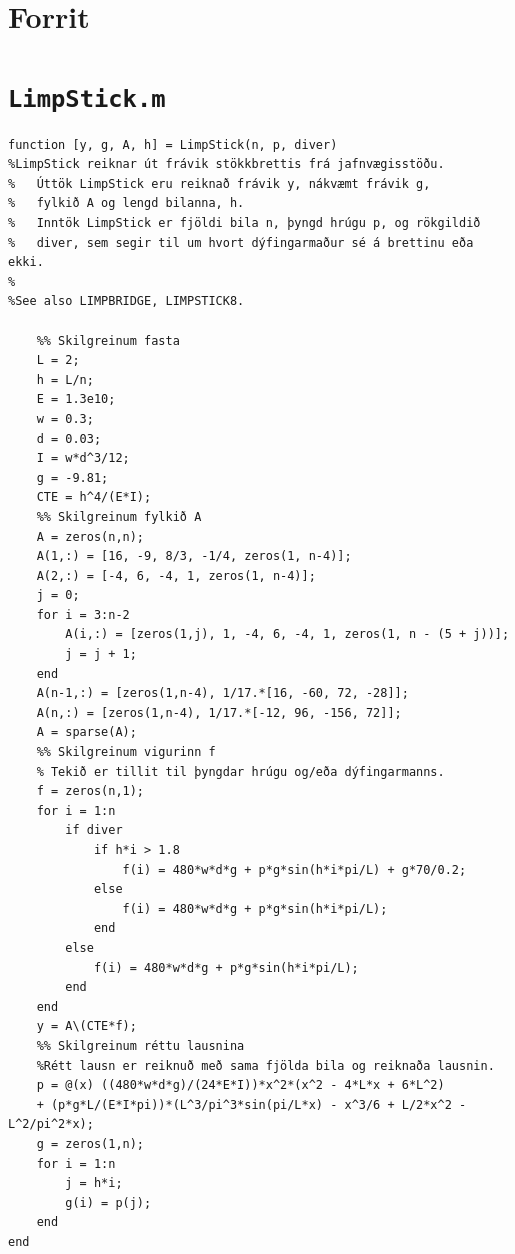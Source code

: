 \documentclass[11pt]{article}
\begin{document}
{\newpage
\section*{Forrit}


\section*{\texttt{LimpStick.m}}
\begin{verbatim}
function [y, g, A, h] = LimpStick(n, p, diver)
%LimpStick reiknar út frávik stökkbrettis frá jafnvægisstöðu.
%   Úttök LimpStick eru reiknað frávik y, nákvæmt frávik g, 
%   fylkið A og lengd bilanna, h.
%   Inntök LimpStick er fjöldi bila n, þyngd hrúgu p, og rökgildið
%   diver, sem segir til um hvort dýfingarmaður sé á brettinu eða ekki.
%
%See also LIMPBRIDGE, LIMPSTICK8.
    
    %% Skilgreinum fasta
    L = 2;
    h = L/n;
    E = 1.3e10;
    w = 0.3;
    d = 0.03;
    I = w*d^3/12;
    g = -9.81;
    CTE = h^4/(E*I);
    %% Skilgreinum fylkið A
    A = zeros(n,n);
    A(1,:) = [16, -9, 8/3, -1/4, zeros(1, n-4)];
    A(2,:) = [-4, 6, -4, 1, zeros(1, n-4)];
    j = 0;
    for i = 3:n-2
        A(i,:) = [zeros(1,j), 1, -4, 6, -4, 1, zeros(1, n - (5 + j))]; 
        j = j + 1;
    end
    A(n-1,:) = [zeros(1,n-4), 1/17.*[16, -60, 72, -28]];
    A(n,:) = [zeros(1,n-4), 1/17.*[-12, 96, -156, 72]];
    A = sparse(A);
    %% Skilgreinum vigurinn f
    % Tekið er tillit til þyngdar hrúgu og/eða dýfingarmanns.
    f = zeros(n,1);
    for i = 1:n
        if diver
            if h*i > 1.8
                f(i) = 480*w*d*g + p*g*sin(h*i*pi/L) + g*70/0.2;
            else
                f(i) = 480*w*d*g + p*g*sin(h*i*pi/L);
            end
        else
            f(i) = 480*w*d*g + p*g*sin(h*i*pi/L);
        end
    end
    y = A\(CTE*f);
    %% Skilgreinum réttu lausnina
    %Rétt lausn er reiknuð með sama fjölda bila og reiknaða lausnin.
    p = @(x) ((480*w*d*g)/(24*E*I))*x^2*(x^2 - 4*L*x + 6*L^2) 
    + (p*g*L/(E*I*pi))*(L^3/pi^3*sin(pi/L*x) - x^3/6 + L/2*x^2 - L^2/pi^2*x);
    g = zeros(1,n);
    for i = 1:n
        j = h*i;
        g(i) = p(j);
    end
end
\end{verbatim}
\newpage

}
\end{document}
